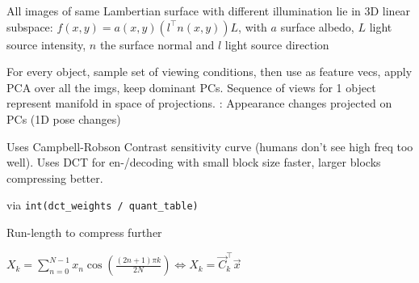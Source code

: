  All images of same Lambertian surface with different illumination lie in 3D linear subspace:
$f(x, y) = a(x, y)(l^\top n(x, y))L$, with $a$ surface albedo, $L$ light source intensity,
$n$ the surface normal and $l$ light source direction

 For every object, sample set of viewing conditions, then use as feature vecs, apply PCA over all the imgs, keep dominant PCs.
Sequence of views for 1 object represent manifold in space of projections. : Appearance changes projected on PCs (1D pose changes)

\shortremark[JPEG] Uses Campbell-Robson Contrast sensitivity curve (humans don't see high freq too well).
Uses DCT for en-/decoding with small block size faster, larger blocks compressing better.

\shortremark[Quantization] via \verb|int(dct_weights / quant_table)|

 Run-length to compress further

\shortdefinition[DCT] $X_k = \sum_{n = 0}^{N - 1} x_n \cos\left( \frac{(2n + 1)\pi k}{2N} \right) \Leftrightarrow X_k = \vec{C}_k^\top \vec{x}$
